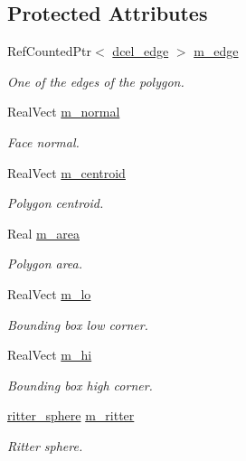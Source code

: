 \subsection*{Protected Attributes}
\begin{DoxyCompactItemize}
\item 
Ref\+Counted\+Ptr$<$ \hyperlink{classdcel__edge}{dcel\+\_\+edge} $>$ \hyperlink{classdcel__poly_aa1869c7861c45b372ea5b93ff2e601e1}{m\+\_\+edge}
\begin{DoxyCompactList}\small\item\em One of the edges of the polygon. \end{DoxyCompactList}\item 
Real\+Vect \hyperlink{classdcel__poly_ac11d42f1a19dc3d289aea11c8d7ce360}{m\+\_\+normal}
\begin{DoxyCompactList}\small\item\em Face normal. \end{DoxyCompactList}\item 
Real\+Vect \hyperlink{classdcel__poly_a747a508bdf30fb3883200564ac0b6b26}{m\+\_\+centroid}
\begin{DoxyCompactList}\small\item\em Polygon centroid. \end{DoxyCompactList}\item 
Real \hyperlink{classdcel__poly_abb8df85ed097283a0ec41841cc5e596c}{m\+\_\+area}
\begin{DoxyCompactList}\small\item\em Polygon area. \end{DoxyCompactList}\item 
Real\+Vect \hyperlink{classdcel__poly_acfbac42d8308ca183ac0b9b67f0994d7}{m\+\_\+lo}
\begin{DoxyCompactList}\small\item\em Bounding box low corner. \end{DoxyCompactList}\item 
Real\+Vect \hyperlink{classdcel__poly_a3015b73d27f5ff15a9f58438816c4e9b}{m\+\_\+hi}
\begin{DoxyCompactList}\small\item\em Bounding box high corner. \end{DoxyCompactList}\item 
\hyperlink{classritter__sphere}{ritter\+\_\+sphere} \hyperlink{classdcel__poly_a10ce12ac725d513f47a8ca90c63b24d3}{m\+\_\+ritter}
\begin{DoxyCompactList}\small\item\em Ritter sphere. \end{DoxyCompactList}\end{DoxyCompactItemize}


